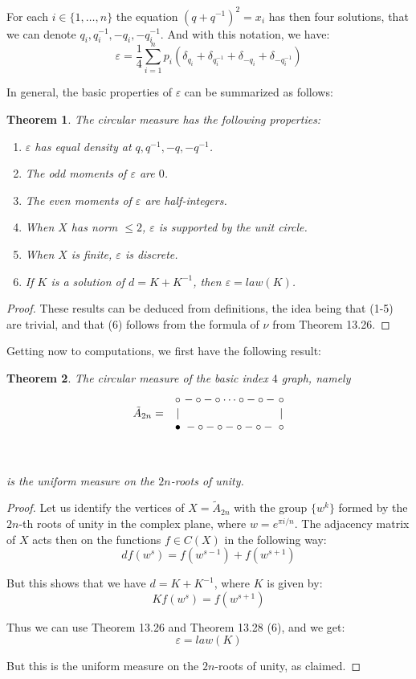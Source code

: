 \documentclass[12pt]{amsbook}
\newtheorem{theorem}{Theorem}[chapter]
\begin{document}
For each $i\in\{1,\ldots,n\}$ the equation $(q+q^{-1})^2=x_i$ has then four solutions, that we can denote $q_i,q_i^{-1},-q_i,-q_i^{-1}$. And with this notation, we have:
$$\varepsilon=\frac{1}{4}\sum_{i=1}^np_i\left(\delta_{q_i}+\delta_{q_i^{-1}}+\delta_{-q_i}+\delta_{-q_i^{-1}}\right)$$

In general, the basic properties of $\varepsilon$ can be summarized as follows:

\begin{theorem}
The circular measure has the following properties:
\begin{enumerate}
\item $\varepsilon$ has equal density at $q,q^{-1},-q,-q^{-1}$.

\item The odd moments of $\varepsilon$ are $0$.

\item The even moments of $\varepsilon$ are half-integers.

\item When $X$ has norm $\leq 2$, $\varepsilon$ is supported by the unit circle.

\item When $X$ is finite, $\varepsilon$ is discrete.

\item If $K$ is a solution of $d=K+K^{-1}$, then $\varepsilon=law(K)$. 
\end{enumerate}
\end{theorem}

\begin{proof}
These results can be deduced from definitions, the idea being that (1-5) are trivial, and that (6) follows from the formula of $\nu$ from Theorem 13.26.
\end{proof}

Getting now to computations, we first have the following result:

\begin{theorem}
The circular measure of the basic index $4$ graph, namely 
$$\begin{matrix}
&\circ&\!\!\!\!-\circ-\circ\cdots\circ-\circ-&\!\!\!\!\circ\cr
\tilde{A}_{2n}=&|&&\!\!\!\!|\cr
&\bullet&\!\!\!\!-\circ-\circ-\circ-\circ-&\!\!\!\!\circ\cr\cr\cr\end{matrix}$$
\vskip-7mm

\noindent is the uniform measure on the $2n$-roots of unity.
\end{theorem}

\begin{proof}
Let us identify the vertices of $X=\tilde{A}_{2n}$ with the group $\{w^k\}$ formed by the $2n$-th roots of unity in the complex plane, where $w=e^{\pi i/n}$. The adjacency matrix of $X$ acts then on the functions $f\in C(X)$ in the following way:
$$df(w^s)=f(w^{s-1})+f(w^{s+1})$$

But this shows that we have $d=K+K^{-1}$, where $K$ is given by:
$$Kf(w^s)=f(w^{s+1})$$

Thus we can use Theorem 13.26 and Theorem 13.28 (6), and we get:
$$\varepsilon=law(K)$$

But this is the uniform measure on the $2n$-roots of unity, as claimed.
\end{proof}
\end{document}
